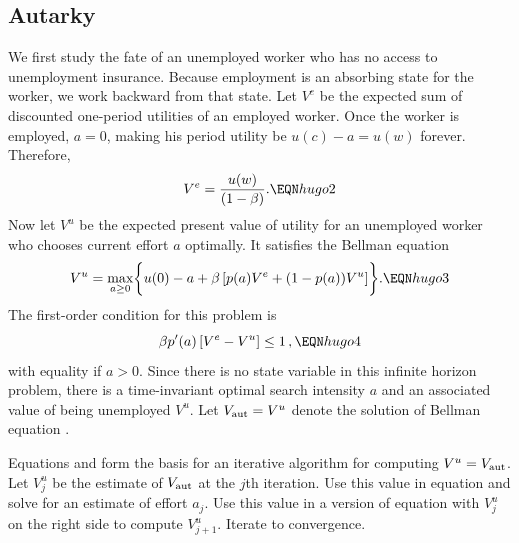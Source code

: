 \subsection{Autarky}
We first study the fate of an unemployed worker
who has no access to unemployment insurance.  Because employment
is an absorbing state for the worker, we work backward from that
state.
  Let $V^e$ be the expected sum of discounted one-period utilities of an employed worker.
Once the worker is employed, $a=0$, making  his period utility
be $u(c)-a = u(w)$ forever.
Therefore,
$$  V^e = {u(w) \over (1-\beta)}  .  \EQN hugo2  $$
Now let $V^u$ be the expected present value of utility for an
unemployed worker who chooses  current effort $a$ %
optimally.  It satisfies the Bellman equation %
%
$$ V^u = \max_{a \geq 0} \biggl\{ u(0) - a + \beta \left[
   p(a) V^e + (1-p(a)) V^u \right] \biggr\} .  \EQN hugo3 $$
The first-order condition for this problem is
$$ \beta p'(a) \left[V^e - V^u \right] \leq 1\,,  \EQN hugo4   $$
with equality if $a>0$. Since there is no state variable in this
infinite horizon problem, there is a time-invariant optimal
search intensity $a$ and an associated value of being unemployed $V^u$.
Let $V_{\rm aut} = V^u$ denote the solution of Bellman equation .

 Equations  and  form the basis for
an iterative algorithm for computing $V^u = V_{\rm aut}$.  Let $V^u_j$ be
the estimate of $V_{\rm aut}$ at the $j$th iteration.   Use this value
in equation  and solve
for an estimate of effort  $a_j$.  Use this value in a version of equation
 with $V^u_j$ on the right side
to compute $V^u_{j+1}$.  Iterate to convergence.

